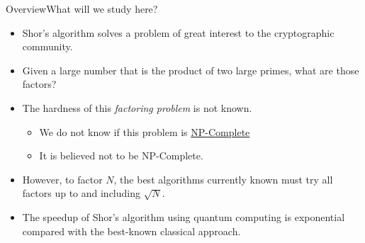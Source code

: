 
\begin{frame}{Overview}{What will we study here?}

\begin{itemize}
    \item Shor's algorithm solves a problem of great interest to the cryptographic community.
    \item Given a large number that is the product of two large primes, what are those factors?
    \item The hardness of this \emph{factoring problem} is not known.
    \begin{itemize}
        \item We do not know if this problem is \href{https://en.wikipedia.org/wiki/NP-completeness}{NP-Complete}
        \item It is believed not to be NP-Complete.
    \end{itemize}
    \item However, to factor $N$, the best algorithms currently known must try all factors up to and including $\sqrt{N}$.
    \item The speedup of Shor's algorithm using quantum computing is exponential compared with the best-known classical approach.
\end{itemize}
    
\end{frame}

